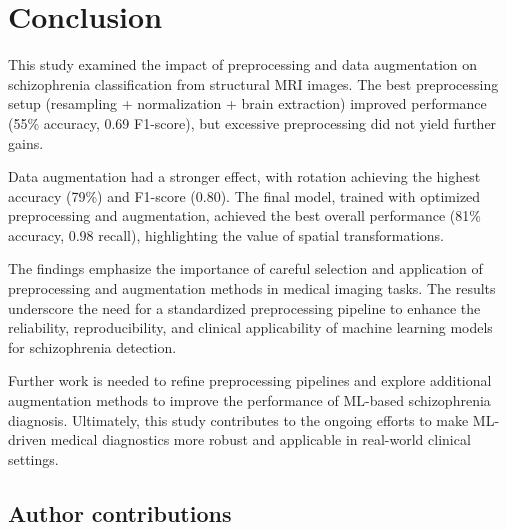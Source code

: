 



\section{Conclusion}

This study examined the impact of preprocessing and data augmentation on schizophrenia classification from structural MRI images. The best preprocessing setup (resampling + normalization + brain extraction) improved performance (55\% accuracy, 0.69 F1-score), but excessive preprocessing did not yield further gains.

Data augmentation had a stronger effect, with rotation achieving the highest accuracy (79\%) and F1-score (0.80). The final model, trained with optimized preprocessing and augmentation, achieved the best overall performance (81\% accuracy, 0.98 recall), highlighting the value of spatial transformations.

The findings emphasize the importance of careful selection and application of preprocessing and augmentation methods in medical imaging tasks. The results underscore the need for a standardized preprocessing pipeline to enhance the reliability, reproducibility, and clinical applicability of machine learning models for schizophrenia detection.

Further work is needed to refine preprocessing pipelines and explore additional augmentation methods to improve the performance of ML-based schizophrenia diagnosis. Ultimately, this study contributes to the ongoing efforts to make ML-driven medical diagnostics more robust and applicable in real-world clinical settings.



\subsection*{Author contributions}

